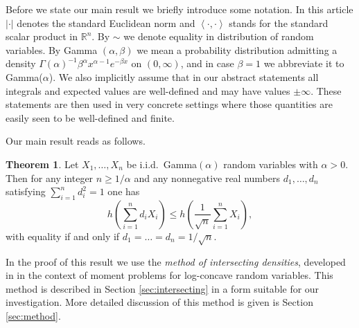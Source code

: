 \documentclass[11pt]{amsart}
\newcommand{\1}{\mathbf{1}}
\newcommand{\R}{\mathbb{R}}
\newcommand{\scal}[2]{\left\langle #1, #2\right\rangle}
\theoremstyle{definition}
\newtheorem{thm}{Theorem}
\theoremstyle{definition}
\theoremstyle{remark}
\begin{document}
Before we state our main result we briefly introduce some notation. In this article $| \cdot|$ denotes the standard Euclidean norm and $\scal{\cdot}{\cdot}$ stands for the standard scalar product in $\R^n$.  By $\sim$ we denote equality in distribution of random variables. By Gamma $(\alpha, \beta)$ we mean a probability distribution admitting a density $\Gamma(\alpha)^{-1}\beta^{\alpha}x^{\alpha-1}e^{-\beta x}$ on $(0, \infty)$, and in case $\beta = 1$ we abbreviate it to Gamma($\alpha$). We also implicitly assume that in our abstract statements all integrals and expected values are well-defined and may have values $\pm \infty$. These statements are then used in very concrete settings where those quantities are easily seen to be well-defined and finite.

 


Our main result reads as follows.

\begin{thm}\label{prop:diagonal-chaos}
Let $X_1, \ldots, X_n$ be i.i.d.\ Gamma$(\alpha)$ random variables with $\alpha > 0$. Then for any integer $n\geq1/\alpha$ and any nonnegative real numbers $d_1, \ldots, d_n$ satisfying $\sum_{i=1}^n d_i^2 = 1$ one has
\[
	h\left( \sum_{i=1}^n d_i X_i \right) \leq h\left( \frac{1}{\sqrt{n}}\sum_{i=1}^n X_i \right), 
\]
with equality if and only if $d_1=\ldots= d_n=1/\sqrt{n}$.
\end{thm}

\noindent In the proof of this result we use the \emph{method of intersecting densities}, developed in \cite{ENT18-2} in the context of moment problems for log-concave random variables. This method is described in Section \ref{sec:intersecting} in a form suitable for our investigation. More detailed discussion of this method is given is Section \ref{sec:method}. 
\end{document}
